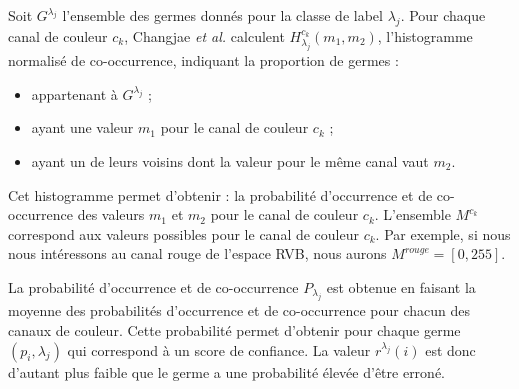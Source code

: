 Soit $G^{\lambda_{j}}$ l'ensemble des germes donnés pour la classe de label $\lambda_{j}$. Pour chaque canal de couleur $c_{k}$, Changjae \textit{et al.} calculent $H_{\lambda_{j}}^{c_{k}}(m_{1},m_{2}) $, l'histogramme normalisé de co-occurrence, indiquant la proportion de germes :
\begin{itemize}
\item appartenant à $G^{\lambda_{j}}$ ;
\item ayant une valeur $m_{1}$ pour le canal de couleur $c_{k}$ ;
\item ayant un de leurs voisins dont la valeur\modif{,} pour le même canal\modif{,} vaut $m_{2}$. 
\end{itemize}

Cet histogramme permet d'obtenir :
la probabilité d’occurrence et de co-occurrence des valeurs $m_{1}$ et $m_{2}$ pour le canal de couleur  $c_{k}$. L'ensemble $ M^{c_{k}}$ correspond aux valeurs possibles pour le canal de couleur $c_{k}$.  Par exemple, si nous nous intéressons au canal rouge de l'espace RVB, nous aurons  $ M^{rouge}=[0,255]$.

 La probabilité d’occurrence et de co-occurrence  $P_{\lambda_{j}}$ est obtenue en faisant la moyenne des probabilités d’occurrence et de co-occurrence pour chacun des canaux de couleur.  Cette probabilité permet d'obtenir pour chaque germe $(p_{i},\lambda_{j})$
qui correspond à un score de confiance. La valeur $r^{\lambda_{j}}(i) $  est donc d'autant plus faible que le germe a une probabilité élevée d'être erroné. 

